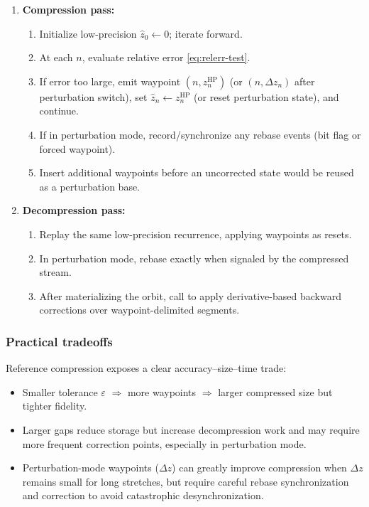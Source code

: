 \begin{enumerate}
  \item \textbf{Compression pass:}
    \begin{enumerate}
      \item Initialize low-precision \(\hat z_0 \leftarrow 0\); iterate forward.
      \item At each \(n\), evaluate relative error \eqref{eq:relerr-test}.
      \item If error too large, emit waypoint \((n, z_n^{\mathrm{HP}})\) (or \((n,\Delta z_n)\) after perturbation switch),
            set \(\hat z_n \leftarrow z_n^{\mathrm{HP}}\) (or reset perturbation state), and continue.
      \item If in perturbation mode, record/synchronize any rebase events (bit flag or forced waypoint).
      \item Insert additional waypoints before an uncorrected state would be
            reused as a perturbation base.
    \end{enumerate}

  \item \textbf{Decompression pass:}
    \begin{enumerate}
      \item Replay the same low-precision recurrence, applying waypoints as resets.
      \item In perturbation mode, rebase exactly when signaled by the compressed stream.
      \item After materializing the orbit, call  to apply
            derivative-based backward corrections over waypoint-delimited segments.
    \end{enumerate}
\end{enumerate}

\subsubsection{Practical tradeoffs}

Reference compression exposes a clear accuracy--size--time trade:
\begin{itemize}
  \item Smaller tolerance \(\varepsilon\) \(\Rightarrow\) more waypoints \(\Rightarrow\) larger compressed size but tighter fidelity.
  \item Larger gaps reduce storage but increase decompression work and may require more frequent correction points,
        especially in perturbation mode.
  \item Perturbation-mode waypoints (\(\Delta z\)) can greatly improve compression when \(\Delta z\) remains small for long
        stretches, but require careful rebase synchronization and correction to avoid catastrophic desynchronization.
\end{itemize}


